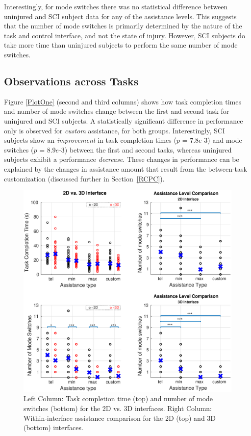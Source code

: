 \documentclass[letterpaper, 10 pt, journal, twoside]{IEEEtran}  %
\begin{document}
	Interestingly, for mode switches there was no statistical difference between uninjured and SCI subject data for any of the assistance levels. 
	This suggests that the number of mode switches is primarily determined by the nature of the task and control interface, and not the state of injury. However, SCI subjects do take more time than uninjured subjects to perform the same number of mode switches. 
	\vspace{-0.1cm}
	\subsection{Observations across Tasks}
	Figure \ref{PlotOne} (second and third columns) shows how task completion times and number of mode switches change between the first and second task for uninjured and SCI subjects. A statistically significant difference in performance only is observed for \textit{custom} assistance, for both groups. 
	Interestingly, SCI subjects show an \textit{improvement} in task completion times ($p$ = $7.8e$-$3$) and mode switches ($p$ = $8.9e$-$3$) between the first and second tasks, whereas uninjured subjects exhibit a performance \textit{decrease}. These changes in performance can be explained by the changes in assistance amount that result from the between-task customization (discussed further in Section~\ref{RCPC}).
	\begin{figure}[t]
		\centering
		\includegraphics[width = 1.2\hsize, center]{./finalfigures/Figure5.eps}
		\vspace{-1.0cm}
		\caption{Left Column: Task completion time (top) and number of mode switches (bottom) for the 2D vs. 3D interfaces. Right Column: Within-interface assistance comparison for the 2D (top) and 3D (bottom) interfaces.}
		\label{PlotTwo}
	\end{figure}
\end{document}
